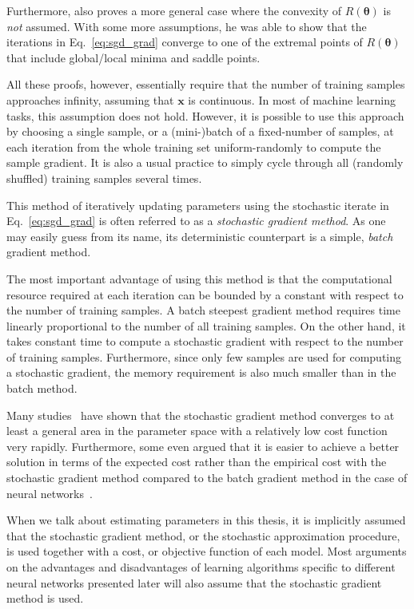 \documentclass{now}
\newcommand{\vect}[1]{\mathbf{#1}}
\newcommand{\vects}[1]{\boldsymbol{#1}}
\newcommand{\vx}[0]{\vect{x}}
\newcommand{\TT}[0]{{\vects{\theta}}}
\begin{document}
Furthermore, \citet{Bottou1998} also proves a more general case where the
convexity of $R(\TT)$ is \textit{not} assumed. With some more assumptions, he
was able to show that the iterations in Eq.~\eqref{eq:sgd_grad} converge to one
of the extremal points of $R(\TT)$ that include global/local minima and saddle
points.

All these proofs, however, essentially require that the number of training
samples approaches infinity, assuming that $\vx$ is continuous. In most of
machine learning tasks, this assumption does not hold. However, it is possible
to use this approach by choosing a single sample, or a (mini-)batch of a
fixed-number of samples, at each iteration from the whole training set
uniform-randomly to compute the sample gradient. It is also a usual practice to
simply cycle through all (randomly shuffled) training samples several times.

This method of iteratively updating parameters using the stochastic iterate in
Eq.~\eqref{eq:sgd_grad} is often referred to as a \textit{stochastic gradient
method}. As one may easily guess from its name, its deterministic counterpart is
a simple, \textit{batch} gradient method.

The most important advantage of using this method is that the computational
resource required at each iteration can be bounded by a constant with respect to
the number of training samples. A batch steepest gradient method requires time
linearly proportional to the number of all training samples.  On the other hand,
it takes constant time to compute a stochastic gradient with respect to the
number of training samples. Furthermore, since only few samples are used for
computing a stochastic gradient, the memory requirement is also much smaller
than in the batch method.

Many studies~\citep[see, e.g.,][]{Bottou2008,Bottou2004} have shown that the
stochastic gradient method converges to at least a general area in the parameter
space with a relatively low cost function very rapidly. Furthermore, some even
argued that it is easier to achieve a better solution in terms of the expected
cost rather than the empirical cost with the stochastic gradient method compared
to the batch gradient method in the case of neural networks~\citep{Lecun1998a}.

When we talk about estimating parameters in this thesis, it is implicitly
assumed that the stochastic gradient method, or the stochastic approximation
procedure, is used together with a cost, or objective function of each model.
Most arguments on the advantages and disadvantages of learning algorithms
specific to different neural networks presented later will also assume that the
stochastic gradient method is used.
\end{document}
